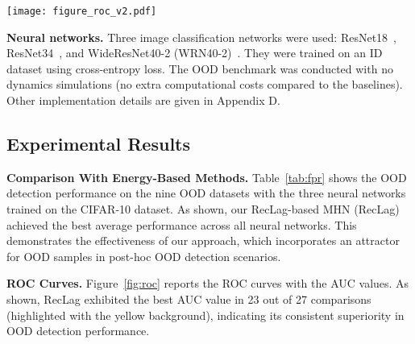 \begin{figure*}
\centering
\texttt{[image: figure\_roc\_v2.pdf]}
\caption{ROC curves (log-scale) and AUC$\uparrow$. Yellow background indicates that RecLag performed the best in terms of AUC.}
\label{fig:roc}
\end{figure*}
\noindent \textbf{Neural networks.}
Three image classification networks were used: ResNet18~\cite{he2016resnet},
ResNet34~\cite{he2016resnet}, and
WideResNet40-2 (WRN40-2)~\cite{zagoruyko2016wide}.
They were trained on an ID dataset using cross-entropy loss. The OOD benchmark was conducted with no dynamics simulations (no extra computational costs compared to the baselines). Other implementation details are given in Appendix D.

\subsection{Experimental Results}
\noindent \textbf{Comparison With Energy-Based Methods.}
Table~\ref{tab:fpr} shows the OOD detection performance on the nine OOD datasets with the three neural networks trained on the CIFAR-10 dataset.
As shown, our RecLag-based MHN (RecLag) achieved the best average performance across all neural networks.
This demonstrates the effectiveness of our approach, which incorporates an attractor for OOD samples in post-hoc OOD detection scenarios.

\noindent \textbf{ROC Curves.}
Figure~\ref{fig:roc} reports the ROC curves with the AUC values. As shown, RecLag exhibited the best AUC value in 23 out of 27 comparisons (highlighted with the yellow background), indicating its consistent superiority in OOD detection performance.

